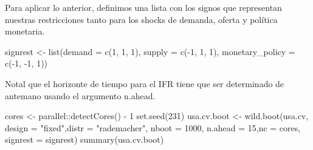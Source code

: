 \documentclass[
]{book}
\newenvironment{Shaded}{\begin{snugshade}}{\end{snugshade}}
\newcommand{\AttributeTok}[1]{\textcolor[rgb]{0.77,0.63,0.00}{#1}}
\newcommand{\DecValTok}[1]{\textcolor[rgb]{0.00,0.00,0.81}{#1}}
\newcommand{\FunctionTok}[1]{\textcolor[rgb]{0.00,0.00,0.00}{#1}}
\newcommand{\NormalTok}[1]{#1}
\newcommand{\OtherTok}[1]{\textcolor[rgb]{0.56,0.35,0.01}{#1}}
\newcommand{\SpecialCharTok}[1]{\textcolor[rgb]{0.00,0.00,0.00}{#1}}
\newcommand{\StringTok}[1]{\textcolor[rgb]{0.31,0.60,0.02}{#1}}
\begin{document}
Para aplicar lo anterior, definimos una lista con los signos que representan nuestras restricciones tanto para los shocks de demanda, oferta y política monetaria.

\begin{Shaded}
\begin{Highlighting}[]
\NormalTok{signrest }\OtherTok{\textless{}{-}} \FunctionTok{list}\NormalTok{(}\AttributeTok{demand =} \FunctionTok{c}\NormalTok{(}\DecValTok{1}\NormalTok{, }\DecValTok{1}\NormalTok{, }\DecValTok{1}\NormalTok{), }\AttributeTok{supply =} \FunctionTok{c}\NormalTok{(}\SpecialCharTok{{-}}\DecValTok{1}\NormalTok{, }\DecValTok{1}\NormalTok{, }\DecValTok{1}\NormalTok{), }\AttributeTok{monetary\_policy =} \FunctionTok{c}\NormalTok{(}\SpecialCharTok{{-}}\DecValTok{1}\NormalTok{, }\SpecialCharTok{{-}}\DecValTok{1}\NormalTok{, }\DecValTok{1}\NormalTok{))}
\end{Highlighting}
\end{Shaded}

Notal que el horizonte de tiempo para el IFR tiene que ser determinado de antemano usando el argumento n.ahead.

\begin{Shaded}
\begin{Highlighting}[]
\NormalTok{cores }\OtherTok{\textless{}{-}}\NormalTok{ parallel}\SpecialCharTok{::}\FunctionTok{detectCores}\NormalTok{() }\SpecialCharTok{{-}} \DecValTok{1}
\FunctionTok{set.seed}\NormalTok{(}\DecValTok{231}\NormalTok{)}
\NormalTok{usa.cv.boot }\OtherTok{\textless{}{-}} \FunctionTok{wild.boot}\NormalTok{(usa.cv, }\AttributeTok{design =} \StringTok{"fixed"}\NormalTok{,}\AttributeTok{distr =} \StringTok{"rademacher"}\NormalTok{, }\AttributeTok{nboot =} \DecValTok{1000}\NormalTok{, }\AttributeTok{n.ahead =} \DecValTok{15}\NormalTok{,}\AttributeTok{nc =}\NormalTok{ cores, }\AttributeTok{signrest =}\NormalTok{ signrest)}
\FunctionTok{summary}\NormalTok{(usa.cv.boot)}
\end{Highlighting}
\end{Shaded}
\end{document}
